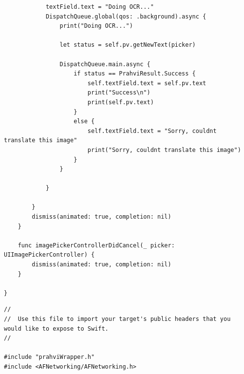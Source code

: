 \begin{lstlisting}
            textField.text = "Doing OCR..."
            DispatchQueue.global(qos: .background).async {
                print("Doing OCR...")
                
                let status = self.pv.getNewText(picker)
                
                DispatchQueue.main.async {
                    if status == PrahviResult.Success {
                        self.textField.text = self.pv.text
                        print("Success\n")
                        print(self.pv.text)
                    }
                    else {
                        self.textField.text = "Sorry, couldnt translate this image"
                        print("Sorry, couldnt translate this image")
                    }
                }
                
            }
            
        }
        dismiss(animated: true, completion: nil)
    }
    
    func imagePickerControllerDidCancel(_ picker: UIImagePickerController) {
        dismiss(animated: true, completion: nil)
    }

}
\end{lstlisting}

\begin{lstlisting}
//
//  Use this file to import your target's public headers that you would like to expose to Swift.
//

#include "prahviWrapper.h"
#include <AFNetworking/AFNetworking.h>
\end{lstlisting}

